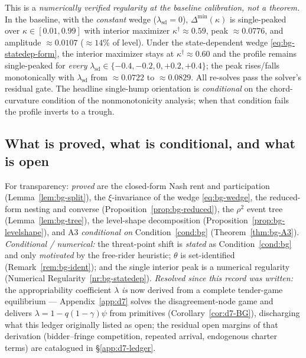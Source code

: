 \documentclass[11pt]{article}
\newcommand{\1}{\mathbf{1}}
\begin{document}
\begin{numreg}
\label{nr:bg-statedep}
This is a \emph{numerically verified regularity at the baseline calibration, not a theorem.} In the baseline, with the \emph{constant} wedge ($\lambda_{\mathrm{sd}}=0$), $\Delta^{\min}(\kappa)$ is single-peaked over $\kappa\in[0.01,0.99]$ with interior maximizer $\kappa^{\dagger}\approx0.59$, peak $\approx0.0776$, and amplitude $\approx0.0107$ ($\approx14\%$ of level). Under the state-dependent wedge \eqref{eq:bg-statedep-form}, the interior maximizer stays at $\kappa^{\dagger}\approx0.60$ and the profile remains single-peaked for \emph{every} $\lambda_{\mathrm{sd}}\in\{-0.4,-0.2,0,+0.2,+0.4\}$; the peak rises/falls monotonically with $\lambda_{\mathrm{sd}}$ from $\approx0.0722$ to $\approx0.0829$. All re-solves pass the solver's residual gate. The headline single-hump orientation is \emph{conditional} on the chord-curvature condition of the nonmonotonicity analysis; when that condition fails the profile inverts to a trough.
\end{numreg}

\subsection{What is proved, what is conditional, and what is open}
\label{app:bg-ledger}

For transparency: \emph{proved} are the closed-form Nash rent and participation (Lemma~\ref{lem:bg-split}), the $\xi$-invariance of the wedge \eqref{eq:bg-wedge}, the reduced-form nesting and converse (Proposition~\ref{prop:bg-reduced}), the $\rho^{2}$ event tree (Lemma~\ref{lem:bg-tree}), the level-shape decomposition (Proposition~\ref{prop:bg-levelshape}), and A3 \emph{conditional on} Condition~\ref{cond:bg} (Theorem~\ref{thm:bg-A3}). \emph{Conditional / numerical:} the threat-point shift is \emph{stated} as Condition~\ref{cond:bg} and only \emph{motivated} by the free-rider heuristic; $\theta$ is set-identified (Remark~\ref{rem:bg-ident}); and the single interior peak is a numerical regularity (Numerical Regularity~\ref{nr:bg-statedep}). \emph{Resolved since this record was written:} the appropriability coefficient $\lambda$ \emph{is} now derived from a complete tender-game equilibrium --- Appendix~\ref{app:d7} solves the disagreement-node game and delivers $\lambda=1-q(1-\gamma)\psi$ from primitives (Corollary~\ref{cor:d7-BG}), discharging what this ledger originally listed as open; the residual open margins of that derivation (bidder--fringe competition, repeated arrival, endogenous charter terms) are catalogued in \S\ref{app:d7-ledger}.
\end{document}
